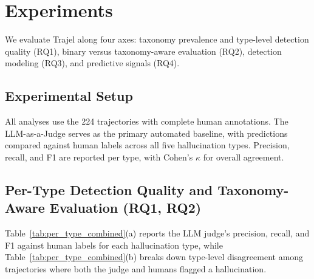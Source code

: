 \documentclass{article}
\begin{document}
\section{Experiments}
\label{sec:experiments}

We evaluate Trajel along four axes: taxonomy prevalence and type-level detection quality (RQ1), binary versus taxonomy-aware evaluation (RQ2), detection modeling (RQ3), and predictive signals (RQ4).

\subsection{Experimental Setup}
\label{sec:exp_setup}

All analyses use the 224 trajectories with complete human annotations. The LLM-as-a-Judge serves as the primary automated baseline, with predictions compared against human labels across all five hallucination types. Precision, recall, and F1 are reported per type, with Cohen's $\kappa$ for overall agreement.

\subsection{Per-Type Detection Quality and Taxonomy-Aware Evaluation (RQ1, RQ2)}
\label{sec:per_type}

Table~\ref{tab:per_type_combined}(a) reports the LLM judge's precision, recall, and F1 against human labels for each hallucination type, while Table~\ref{tab:per_type_combined}(b) breaks down type-level disagreement among trajectories where both the judge and humans flagged a hallucination.
\end{document}
